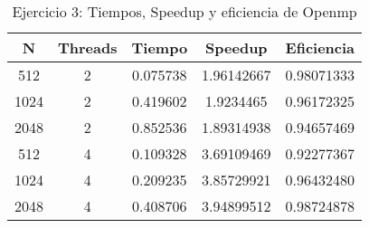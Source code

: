 \begin{table}[htbp]
\centering
\caption{Ejercicio 3: Tiempos, Speedup y eficiencia de Openmp}
\begin{tabular}{|c|c|c|c|c|}
\hline
\textbf{N} & \textbf{Threads} & \textbf{Tiempo} & \textbf{Speedup} & \textbf{Eficiencia} \\ \hline
512        & 2                & 0.075738        & 1.96142667        & 0.98071333          \\ \hline
1024       & 2                & 0.419602        & 1.9234465       & 0.96172325          \\ \hline
2048       & 2                & 0.852536        & 1.89314938       & 0.94657469          \\ \hline
512        & 4                & 0.109328        & 3.69109469       & 0.92277367          \\ \hline
1024       & 4                & 0.209235        & 3.85729921       & 0.96432480          \\ \hline
2048       & 4                & 0.408706        & 3.94899512       & 0.98724878          \\ \hline
\end{tabular}
\end{table}
